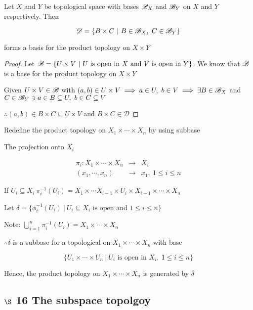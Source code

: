 \begin{thm*}
	Let $X$ and $Y$ be topological space with bases $\mathscr{B}_X$ and $\mathscr{B}_Y$ on $X$ and $Y$ respectively. Then
	
	$$\mathscr{D} = \{B \times C ~|~ B \in \mathscr{B}_X,~C \in \mathscr{B}_Y\}$$

	forms a basis for the product topology on $X \times Y$
\end{thm*}

\begin{proof}
	Let $\mathscr{B} = \{U \times V ~|~ U \text{ is open in }X \text{ and } V \text{ is open in }Y\}$. We know that $\mathscr{B}$ is a base for the product topology on $X \times Y$
	
	Given $U \times V \in \mathscr{B}$ with $(a,b) \in U \times V \implies a \in U,~b \in V \implies \exists B \in \mathscr{B}_X$ and $C \in \mathscr{B}_Y \ni a \in B \subseteq U,~b \in C \subseteq V$
	
	$\therefore (a,b) \in B \times C \subseteq U \times V$ and $B \times C \in \mathscr{D}$
\end{proof}

Redefine the product topology on $X_1 \times \cdots \times X_n$ by using subbase

The projection onto $X_i$

\begin{eqnarray*}
	\pi_i: X_1 \times \cdots \times X_n &\rightarrow & X_i\\
	(x_1,\cdots,x_n) &\rightarrow& x_1 ,~1 \leq i \leq n
\end{eqnarray*}

If $U_i \subseteq X_i~ \pi_i^{-1}(U_i) = X_1 \times \cdots X_{i-1} \times U_i \times X_{i+1} \times \cdots \times X_n$

Let $\delta = \{\phi_i^{-1}(U_i)~|~ U_i \subseteq X_i \text{ is open and } 1\leq i \leq n\}$

Note: $\bigcup_{i = 1}^n\pi_i^{-1}(U_i) = X_1 \times \cdots \times X_n$

$\therefore \delta$ is a subbase for a topological on $X_1 \times \cdots \times X_n$ with base

$$\{U_1 \times \cdots \times U_n~|~ U_i \text{ is open in }X_i,~1 \leq i \leq n\}$$

Hence, the product topology on $X_1 \times \cdots \times X_n$ is generated by $\delta$

\subsection*{$\S$ 16 The subspace topolgoy}

